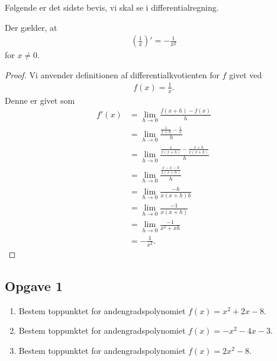 Følgende er det sidste bevis, vi skal se i differentialregning.
\begin{setn}
	Der gælder, at 
	\begin{align*}
		\left(\frac{1}{x}\right)' = -\frac{1}{x^2}
	\end{align*}
	for $x\neq 0$. 
\end{setn}
\begin{proof}
	Vi anvender definitionen af differentialkvotienten for $f$ givet ved
	\begin{align*}
		f(x) = \frac{1}{x}.
	\end{align*}
	Denne er givet som
	\begin{align*}
		f'(x) &= \lim_{h \to 0} \frac{f(x+h)-f(x)}{h} \\
		&= \lim_{h \to 0} \frac{\frac{1}{x+h} - \frac{1}{x}}{h} \\
		&= \lim_{h \to 0} \frac{\frac{x}{x(x+h)}-\frac{x+h}{x(x+h)}}{h} \\
		&= \lim_{h \to 0} \frac{\frac{x-x-h}{x(x+h)}}{h} \\
		&= \lim_{h \to 0} \frac{-h}{x(x+h)h} \\
		&= \lim_{h \to 0} \frac{-1}{x(x+h)} \\
		&= \lim_{h \to 0} \frac{-1}{x^2+xh} \\
		&= -\frac{1}{x^2}.
	\end{align*}
\end{proof}


\subsection*{Opgave 1}

\begin{enumerate}[label=\roman*)]
	\item Bestem toppunktet for andengradspolynomiet $f(x) = x^2+2x-8$.
	\item Bestem toppunktet for andengradspolynomiet $f(x) = -x^2-4x - 3$.
	\item Bestem toppunktet for andengradspolynomiet $f(x) = 2x^2-8$.
\end{enumerate}

